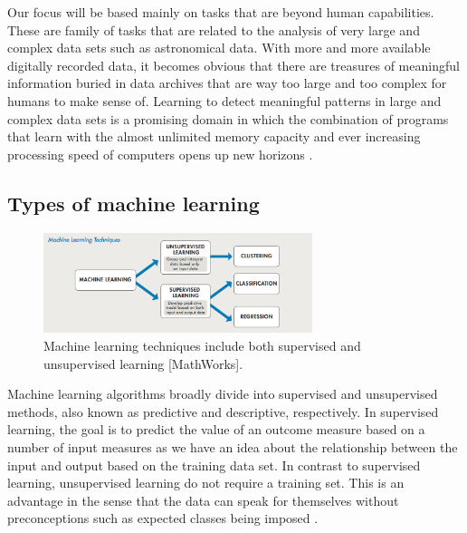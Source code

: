 Our focus will be based mainly on tasks that are beyond human capabilities. These are family of tasks that are related to the analysis of very large and complex data sets such as astronomical data. With more and more available digitally recorded data, it becomes obvious that there are treasures of meaningful information buried in data archives that are way too large and too complex for humans
to make sense of. Learning to detect meaningful patterns in large
and complex data sets is a promising domain in which the combination
of programs that learn with the almost unlimited memory
capacity and ever increasing processing speed of computers opens up new horizons \citep{shalev2014understanding}.

\subsection{Types of machine learning}

\begin{figure}[H]
  \centering
    \includegraphics[width=0.7\textwidth]{images/Ml_techs.png}
    \caption{Machine learning techniques include both supervised and unsupervised learning [MathWorks].}
  \label{sup-unsup}
\end{figure}

Machine learning algorithms broadly divide into supervised and unsupervised methods, also known as predictive and descriptive, respectively. In supervised learning, the goal is to predict the value of an outcome measure based on a number of input measures as we have an idea about the relationship between the input and output based on the training data set. In contrast to supervised learning, unsupervised learning do not require a training set. This is an advantage in the sense that the data can speak for themselves
without preconceptions such as expected classes being imposed \citep{ball2010data}. 

